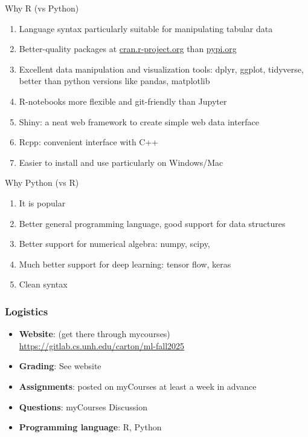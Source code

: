 \documentclass{beamer}
\begin{document}
\begin{frame}{Why R (vs Python)}
\begin{enumerate}
    \item Language syntax particularly suitable for manipulating tabular data
    \item Better-quality packages at \url{cran.r-project.org} than \url{pypi.org}
    \item Excellent data manipulation and visualization tools: dplyr, ggplot, tidyverse, better than python versions like pandas, matplotlib
    \item R-notebooks more flexible and git-friendly than Jupyter
    \item Shiny: a neat web framework to create simple web data interface
    \item Rcpp: convenient interface with C++
    \item Easier to install and use particularly on Windows/Mac
\end{enumerate}
\end{frame}

\begin{frame}{Why Python (vs R)}
    \begin{enumerate}
\item It is popular
\vfill
            \item Better general programming language, good support for data structures
\vfill
            \item Better support for numerical algebra: numpy, scipy,
\vfill
            \item Much better support for deep learning: tensor flow, keras
\vfill
            \item Clean syntax
    \end{enumerate}
\end{frame}


\begin{frame}\frametitle{Logistics}
\begin{itemize}
\item \textbf{Website}:  (get there through mycourses) \\ {\small\url{https://gitlab.cs.unh.edu/carton/ml-fall2025}}
\item \textbf{Grading}: See website
\item \textbf{Assignments}: posted on myCourses at least a week in advance
\item \textbf{Questions}: myCourses Discussion
\item \textbf{Programming language}: R, Python
\end{itemize}
\end{frame}
\end{document}
